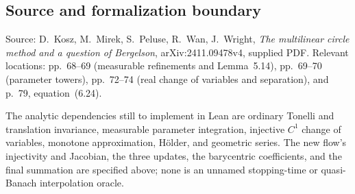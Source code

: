 \documentclass[11pt]{article}
\begin{document}
\subsection*{Source and formalization boundary}
Source: D.~Kosz, M.~Mirek, S.~Peluse, R.~Wan, J.~Wright,
\emph{The multilinear circle method and a question of Bergelson},
arXiv:2411.09478v4, supplied PDF. Relevant locations: pp.~68--69
(measurable refinements and Lemma~5.14), pp.~69--70 (parameter towers),
pp.~72--74 (real change of variables and separation), and p.~79,
equation~(6.24).

The analytic dependencies still to implement in Lean are ordinary Tonelli
and translation invariance, measurable parameter integration, injective
$C^1$ change of variables, monotone approximation, H\"older, and geometric
series. The new flow's injectivity and Jacobian, the three updates, the
barycentric coefficients, and the final summation are specified above;
none is an unnamed stopping-time or quasi-Banach interpolation oracle.
\end{document}
